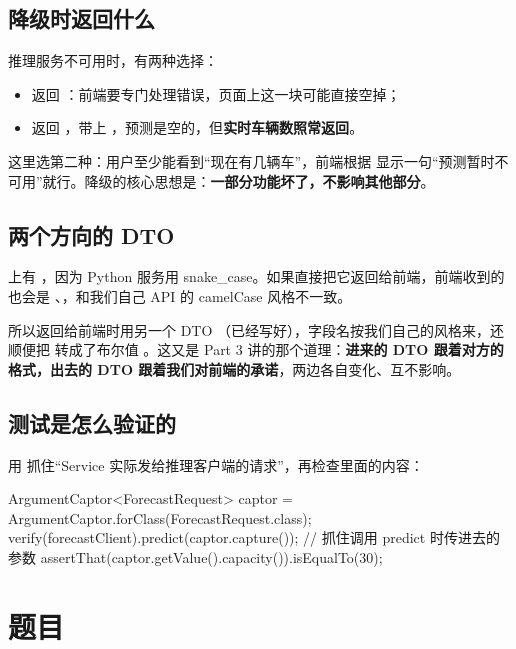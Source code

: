 \subsection{降级时返回什么}

推理服务不可用时，有两种选择：
\begin{itemize}
  \item 返回 ：前端要专门处理错误，页面上这一块可能直接空掉；
  \item 返回 ，带上 ，预测是空的，但\textbf{实时车辆数照常返回}。
\end{itemize}

这里选第二种：用户至少能看到“现在有几辆车”，前端根据  显示一句“预测暂时不可用”就行。降级的核心思想是：\textbf{一部分功能坏了，不影响其他部分}。

\subsection{两个方向的 DTO}

 上有 ，因为 Python 服务用 snake\_case。如果直接把它返回给前端，前端收到的也会是 、，和我们自己 API 的 camelCase 风格不一致。

所以返回给前端时用另一个 DTO （已经写好），字段名按我们自己的风格来，还顺便把  转成了布尔值 。这又是 Part 3 讲的那个道理：\textbf{进来的 DTO 跟着对方的格式，出去的 DTO 跟着我们对前端的承诺}，两边各自变化、互不影响。

\subsection{测试是怎么验证的}

 用  抓住“Service 实际发给推理客户端的请求”，再检查里面的内容：

\begin{java}
ArgumentCaptor<ForecastRequest> captor = ArgumentCaptor.forClass(ForecastRequest.class);
verify(forecastClient).predict(captor.capture());        // 抓住调用 predict 时传进去的参数
assertThat(captor.getValue().capacity()).isEqualTo(30);
\end{java}

\section{题目}

